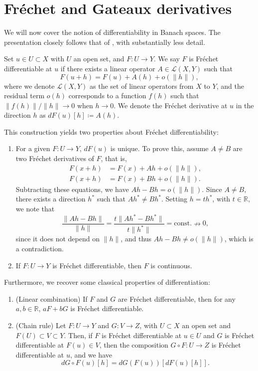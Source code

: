 \section{Fréchet and Gateaux derivatives}
We will now cover the notion of differentiability in Banach spaces. The presentation closely follows that of \cite{ambrosetti1995primer}, with substantially less detail.
\begin{definition}
    Set $u\in U \subset X$ with $U$ an open set, and $F:U\to Y$. We say $F$ is Fréchet differentiable at $u$ if there exists a linear operator $A\in\mathcal{L}(X,Y)$ such that
    \begin{equation*}
        F(u+h)=F(u)+A(h)+o(\|h\|),
    \end{equation*}
    where we denote $\mathcal{L}(X,Y)$ as the set of linear operators from $X$ to $Y$, and the residual term $o(h)$ corresponds to a function $f(h)$ such that $\|f(h)\|/\|h\| \to 0$ when $h\to 0$. We denote the Fréchet derivative at $u$ in the direction $h$ as $dF(u)[h] \coloneqq A(h)$.
\end{definition}
This construction yields two properties about Fréchet differentiability:
\begin{enumerate}
    \item For a given $F:U\to Y$, $dF(u)$ is unique. To prove this, assume $A\neq B$ are two Fréchet derivatives of $F$, that is, 
    \begin{align*}
        F(x+h) &= F(x) + Ah + o(\|h\|), \\
        F(x+h) &= F(x) + Bh + o(\|h\|).
    \end{align*}
    Subtracting these equations, we have $Ah - Bh = o(\|h\|)$. Since $A\neq B$, there exists a direction $h^*$ such that $Ah^* \neq Bh^*$. Setting $h=th^*$, with $t\in \mathbb{R}$, we note that
    \begin{equation*}
        \frac{\|Ah-Bh\|}{\|h\|} = \frac{t\|Ah^*-Bh^*\|}{t\|h^*\|} = \text{const.} \nrightarrow 0,
    \end{equation*}
    since it does not depend on $\|h\|$, and thus $Ah - Bh \neq o(\|h\|)$, which is a contradiction. 
    \item If $F:U\to Y$ is Fréchet differentiable, then $F$ is continuous.
\end{enumerate}

Furthermore, we recover some classical properties of differentiation:
\begin{enumerate}
    \item (Linear combination) If $F$ and $G$ are Fréchet differentiable, then for any $a,b\in\mathbb{R}$, $aF+bG$ is Fréchet differentiable.
    \item (Chain rule) Let $F:U\to Y$ and $G:V\to Z$, with $U\subset X$ an open set and $F(U)\subset V\subset Y$. Then, if $F$ is Fréchet differentiable at $u\in U$ and $G$ is Fréchet differentiable at $F(u)\in V$, then the composition $G\circ F:U\to Z$ is Fréchet differentiable at $u$, and we have
        \begin{equation*}
            dG\circ F(u)[h] = dG(F(u))[dF(u)[h]].
        \end{equation*}
\end{enumerate}

